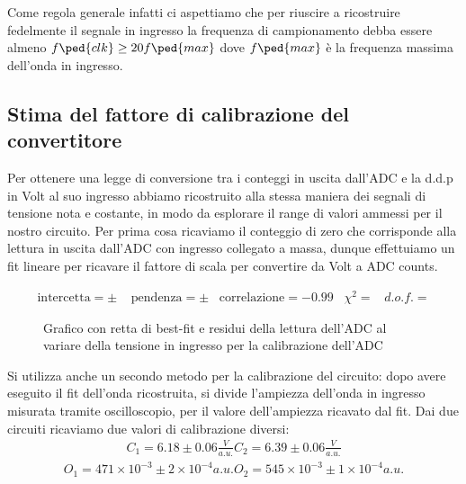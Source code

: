 \documentclass[10pt, a4paper, italian]{article}
\begin{document}
Come regola generale infatti ci aspettiamo che per riuscire a ricostruire
fedelmente il segnale in ingresso la frequenza di campionamento debba essere
almeno $f\ped{clk} \geq 20 f\ped{max}$ dove $f\ped{max}$ è la frequenza
massima dell'onda in ingresso.

\subsection{Stima del fattore di calibrazione del convertitore}
Per ottenere una legge di conversione tra i conteggi in uscita dall'ADC e
la d.d.p in Volt al suo ingresso abbiamo ricostruito alla stessa maniera dei
segnali di tensione nota e costante, in modo da esplorare il range di valori
ammessi per il nostro circuito. Per prima cosa ricaviamo il conteggio di zero
che corrisponde alla lettura in uscita dall'ADC con ingresso collegato a massa,
dunque effettuiamo un fit lineare per ricavare il fattore di scala per
convertire da Volt a ADC counts.

\begin{align*}
\mathrm{intercetta} =  \pm \;  \;\;\;\mathrm{pendenza} = \pm  \;\;\;\mathrm{correlazione} 
= -0.99 \;\;\; \chi^2 =  \;\;\; d.o.f. = 
\end{align*}

\begin{figure}[htbp]
    \centering
    \caption{Grafico con retta di best-fit e residui della lettura dell'ADC
    al variare della tensione in ingresso per la calibrazione dell'ADC
    \label{fig: cal}}
\end{figure}

Si utilizza anche un secondo metodo per la calibrazione del circuito: dopo avere eseguito il fit dell'onda ricostruita, si divide l'ampiezza dell'onda in ingresso misurata tramite oscilloscopio, per il valore dell'ampiezza ricavato dal fit.
Dai due circuiti ricaviamo due valori di calibrazione diversi:
\begin{align*}
C_{1}=6.18 \pm 0.06 \frac{V}{a.u.}
C_{2}=6.39 \pm 0.06 \frac{V}{a.u.}
\end{align*}
\begin{align*}
O_{1}=471 \times 10^{-3} \pm 2 \times 10^{-4} \si{a.u.}
O_{2}=545 \times 10^{-3} \pm 1 \times 10^{-4} \si{a.u.}
\end{align*}
\end{document}
